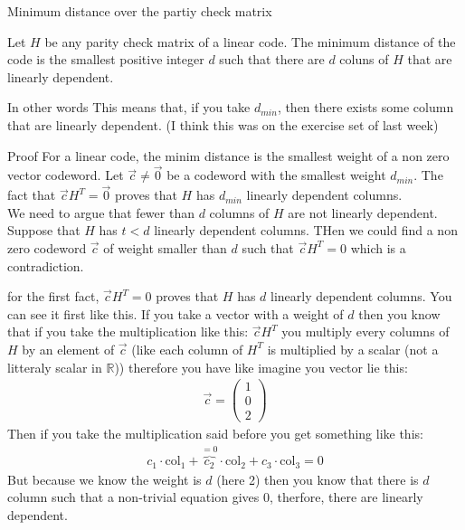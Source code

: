 

\begin{parag}{Minimum distance over the partiy check matrix}
	\begin{theoreme}
	     Let $H$ be any parity check matrix of a linear code. The minimum distance of the code is the smallest positive integer $d$ such that there are $d$ coluns of $H$ that are linearly dependent.
	\end{theoreme}
	\begin{subparag}{In other words}
	    This means that, if you take $d_{min}$, then there exists some column that are linearly dependent. (I think this was on the exercise set of last week)
	\end{subparag}
	\begin{subparag}{Proof}
	    For a linear code, the minim distance is the smallest weight of a non zero vector codeword. Let $\vec{c} \neq \vec{0}$ be a codeword with the smallest weight $d_{min}$. The fact that $\vec{c}H^T =  \vec{0}$ proves that $H$ has $d_{min}$ linearly dependent columns.\\
	    We need to argue that fewer than $d$ columns of $H$ are not linearly dependent. Suppose that $H$ has $t < d$ linearly dependent columns. THen we could find a non zero codeword $\vec{c}$ of weight smaller than $d$ such that $\vec{c}H^T =  0$ which is a contradiction.

	\end{subparag}
    
	\begin{framedremark}
	  for the first fact, $\vec{c}H^T =  0$ proves that $H$ has $d$ linearly dependent columns. You can see it first like this. If you take a vector with a weight of $d$ then you know that if you take the multiplication like this: $\vec{c}H^T$ you multiply every columns of $H$ by an element of $\vec{c}$ (like each column of $H^T$ is multiplied by a scalar (not a litteraly scalar in $\mathbb{R}$)) therefore you have like imagine you vector lie this:
	  \begin{align*} 
		  \vec{c} =  \begin{pmatrix} 1 \\ 0 \\ 2 \end{pmatrix} 
	  \end{align*}
	  Then if you take the multiplication said before you get something like this:
	  \begin{align*} 
		  c_1 \cdot  \text{col}_1 + \overbrace{c_2}^{= 0} \cdot  \text{col}_2 + c_3 \cdot  \text{col}_3 =  0
	  \end{align*}
	  But because we know the weight is $d$ (here 2) then you know that  there is $d$ column such that a non-trivial equation gives $0$, therfore, there are linearly dependent.
	\end{framedremark}
\end{parag}





